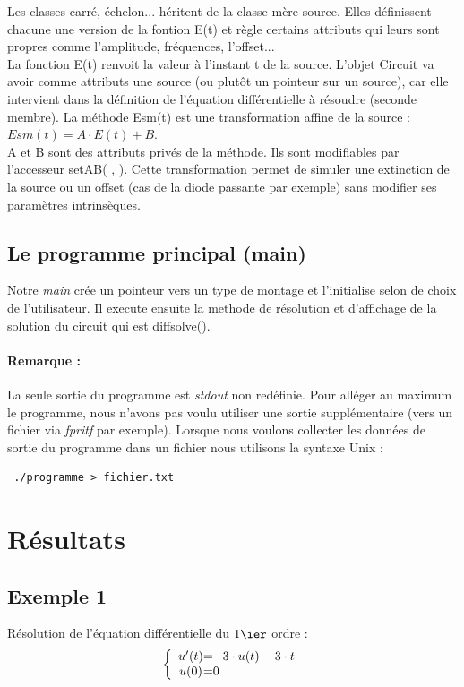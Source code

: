 \documentclass[a4paper,11pt]{article}
\begin{document}
Les classes carré, échelon... héritent de la classe mère source. Elles définissent chacune une version de la fontion E(t) et règle certains
attributs qui leurs sont propres comme l'amplitude, fréquences, l'offset...\\
La fonction E(t) renvoit la valeur à l'instant t de la source. L'objet Circuit va avoir comme attributs une source (ou plutôt un pointeur sur un source), 
car elle intervient dans la définition de l'équation différentielle à résoudre (seconde membre).
La méthode Esm(t) est une transformation affine de la source : $ Esm(t) = A \cdot E(t) + B$. \\A et B sont des attributs privés de la méthode.
Ils sont modifiables par l'accesseur setAB( , ). Cette transformation permet de simuler une extinction de la source ou un offset (cas de la diode 
passante par exemple) sans modifier ses paramètres intrinsèques.

\subsection{Le programme principal (main)}
Notre \textit{main} crée un pointeur vers un type de montage et l'initialise selon de choix de l'utilisateur.
Il execute ensuite la methode de résolution et d'affichage de la solution du circuit qui est diffsolve().

\paragraph{Remarque : }La seule sortie du programme est \textit{stdout} non redéfinie. Pour alléger au maximum le programme, nous n'avons pas voulu 
utiliser une sortie supplémentaire (vers un fichier via \textit{fpritf} par exemple). Lorsque nous voulons collecter les données de sortie 
du programme dans un fichier nous utilisons la syntaxe Unix : 
\begin{lstlisting}
 ./programme > fichier.txt
\end{lstlisting}
\newpage

\section{Résultats}
  \subsection{Exemple 1}
Résolution de l'équation différentielle du $1\ier$ ordre :
\begin{equation*}
 \left \{
  \begin{array}{c @{=} l}
    u'(t) & -3\cdot u(t)-3\cdot t
\\
   u(0) & 0
  \end{array}
\right.
\end{equation*} 
\end{document}
